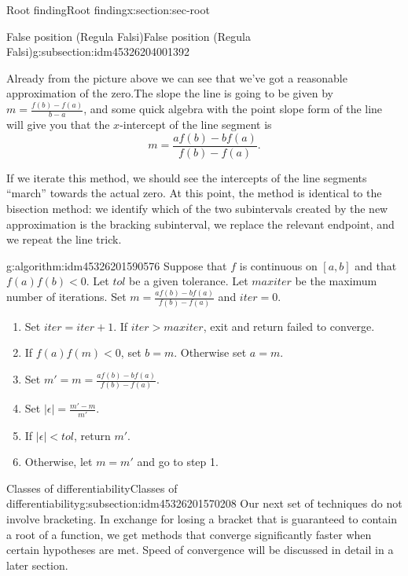 \documentclass[oneside,10pt,]{article}
\numberwithin{equation}{section}
\newcommand{\abs}[1]{\left\vert#1\right\vert}
\numberwithin{equation}{section}
\newcommand{\lt}{<}
\newcommand{\gt}{>}
\begin{document}
\begin{sectionptx}{Root finding}{}{Root finding}{}{}{x:section:sec-root}
\begin{subsectionptx}{False position (Regula Falsi)}{}{False position (Regula Falsi)}{}{}{g:subsection:idm45326204001392}
\begin{sageoutput}
\end{sageoutput}
Already from the picture above we can see that we've got a reasonable approximation of the zero.The slope the line is going to be given by \(m = \frac{f(b) - f(a)}{b - a}\), and some quick algebra with the point slope form of the line will give you that the \(x\)-intercept of the line segment is%
\begin{equation*}
m = \frac{a f(b) - b f(a)}{f(b) - f(a)}.
\end{equation*}
%
\par
If we iterate this method, we should see the intercepts of the line segments ``march'' towards the actual zero. At this point, the method is identical to the bisection method: we identify which of the two subintervals created by the new approximation is the bracking subinterval, we replace the relevant endpoint, and we repeat the line trick.%
\begin{algorithm}{}{}{g:algorithm:idm45326201590576}%
Suppose that \(f\) is continuous on \([a,b]\) and that \(f(a)f(b) \lt 0\). Let \(tol\) be a given tolerance. Let \(maxiter\) be the maximum number of iterations. Set \(m = \frac{a f(b) - b f(a)}{f(b) - f(a)}\) and \(iter = 0\).%
\begin{enumerate}
\item{}Set \(iter = iter + 1\). If \(iter \gt maxiter\), exit and return failed to converge.%
\item{}If \(f(a)f(m) \lt 0\), set \(b = m\). Otherwise set \(a = m\).%
\item{}Set \(m' = m = \frac{a f(b) - b f(a)}{f(b) - f(a)}\).%
\item{}Set \(\abs{\epsilon} = \frac{m' - m}{m'}\).%
\item{}If \(\abs{\epsilon} \lt tol\), return \(m'\).%
\item{}Otherwise, let \(m = m'\) and go to step 1.%
\end{enumerate}
%
\end{algorithm}
\end{subsectionptx}
%
%
\typeout{************************************************}
\typeout{************************************************}
%
\begin{subsectionptx}{Classes of differentiability}{}{Classes of differentiability}{}{}{g:subsection:idm45326201570208}
Our next set of techniques do not involve bracketing. In exchange for losing a bracket that is guaranteed to contain a root of a function, we get methods that converge significantly faster when certain hypotheses are met. Speed of convergence will be discussed in detail in a later section.%

\end{subsectionptx}
\end{sectionptx}
\end{document}
